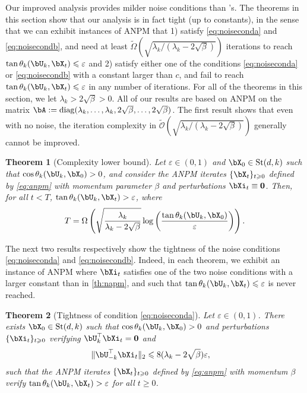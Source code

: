 \documentclass{article}
\theoremstyle{plain}
\newtheorem{theorem}{Theorem}[section]
\theoremstyle{definition}
\theoremstyle{remark}
\begin{document}
Our improved analysis provides milder noise conditions than \citet{xu2023anpm}'s. The theorems in this section show that our analysis is in fact tight (up to constants), in the sense that we can exhibit instances of ANPM that 1) satisfy \eqref{eq:noiseconda} and \eqref{eq:noisecondb}, and need at least $\tilde{\Omega}(\sqrt{\lambda_k/(\lambda_k-2\sqrt{\beta})})$ iterations to reach $\tan\theta_k(\bU_k,\bX_t) \leqslant \varepsilon$ and 2) satisfy either one of the conditions \eqref{eq:noiseconda} or \eqref{eq:noisecondb} with a constant larger than $c$, and fail to reach $\tan\theta_k(\bU_k,\bX_t) \leqslant \varepsilon$ in any number of iterations.
For all of the theorems in this section, we let $\lambda_k>2\sqrt{\beta} > 0$. All of our results are based on ANPM on the matrix $\bA := \mathrm{diag}(\lambda_k,\dots,\lambda_k,2\sqrt{\beta},\dots,2\sqrt{\beta})$. The first result shows that even with no noise, the iteration complexity in $\tilde{\mathcal{O}}(\sqrt{\lambda_k/(\lambda_k-2\sqrt{\beta})})$ generally cannot be improved.

\begin{theorem}[Complexity lower bound]\label{th:napm_complexity_lb}
  Let $\varepsilon \in (0,1)$ and $\bX_0 \in \mathrm{St}(d,k)$ such that $\cos\theta_k(\bU_k, \bX_0) > 0$, and consider the ANPM iterates $\{\bX_t\}_{t\geqslant 0}$ defined by \eqref{eq:anpm} with momentum parameter $\beta$ and perturbations $\bXi_t \equiv \mathbf{0}$. Then, for all $t < T$, $\tan\theta_k(\bU_k, \bX_t) > \varepsilon$, where
  \begin{align*}
    T = \Omega\left( \sqrt{\frac{\lambda_k}{\lambda_k-2\sqrt{\beta}}} \log\left(\frac{\tan\theta_k(\bU_k, \bX_0)}{\varepsilon}\right)\right).
  \end{align*}
\end{theorem}

The next two results respectively show the tightness of the noise conditions \eqref{eq:noiseconda} and \eqref{eq:noisecondb}. Indeed, in each theorem, we exhibit an instance of ANPM where $\bXi_t$ satisfies one of the two noise conditions with a larger constant than in \cref{th:napm}, and such that $\tan\theta_k(\bU_k, \bX_t) \leqslant \varepsilon$ is never reached.

\begin{theorem}[Tightness of condition \eqref{eq:noiseconda}]\label{th:noisecond_necessary_1}
  Let $\varepsilon \in (0,1)$. There exists $\bX_0 \in \mathrm{St}(d,k)$ such that $\cos\theta_k(\bU_k, \bX_0) > 0$ and perturbations $\{\bXi_t\}_{t\geqslant 0}$ verifying $\bU_k^\top \bXi_t = \mathbf{0}$ and
  \begin{align*}
    & \Vert \bU_{-k}^\top\bXi_t \Vert_2 \leqslant 8 (\lambda_k - 2\sqrt{\beta})\varepsilon,
  \end{align*}
  such that the ANPM iterates $\{\bX_t\}_{t\geqslant 0}$ defined by \eqref{eq:anpm} with momentum $\beta$ verify $\tan\theta_k(\bU_k, \bX_t) > \varepsilon$ for all $t\geqslant 0$. 
\end{theorem}
\end{document}

